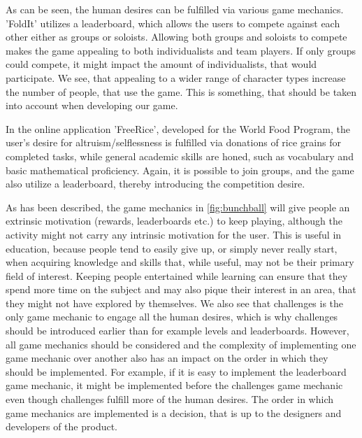 As can be seen, the human desires can be fulfilled via various game mechanics.
'FoldIt' utilizes a leaderboard, which allows the users to compete against each other either as groups or soloists.
Allowing both groups and soloists to compete makes the game appealing to both individualists and team players.
If only groups could compete, it might impact the amount of individualists, that would participate.
We see, that appealing to a wider range of character types increase the number of people, that use the game.
This is something, that should be taken into account when developing our game.\newline

In the online application 'FreeRice', developed for the World Food Program, the user's desire for altruism/selflessness is fulfilled via donations of rice grains for completed tasks, while general academic skills are honed, such as vocabulary and basic mathematical proficiency. Again, it is possible to join groups, and the game also utilize a leaderboard, thereby introducing the competition desire.\cite{freerice}\newline

As has been described, the game mechanics in \autoref{fig:bunchball} will give people an extrinsic motivation (rewards, leaderboards etc.) to keep playing, although the activity might not carry any intrinsic motivation for the user.
This is useful in education, because people tend to easily give up, or simply never really start, when acquiring knowledge and skills that, while useful, may not be their primary field of interest.
Keeping people entertained while learning can ensure that they spend more time on the subject and may also pique their interest in an area, that they might not have explored by themselves.
We also see that challenges is the only game mechanic to engage all the human desires, which is why challenges should be introduced earlier than for example levels and leaderboards.
However, all game mechanics should be considered and the complexity of implementing one game mechanic over another also has an impact on the order in which they should be implemented.
For example, if it is easy to implement the leaderboard game mechanic, it might be implemented before the challenges game mechanic even though challenges fulfill more of the human desires.
The order in which game mechanics are implemented is a decision, that is up to the designers and developers of the product.
